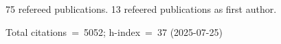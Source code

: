 75 refereed publications. 13 refeered publications as first author.

Total citations~=~5052; h-index~=~37 (2025-07-25)